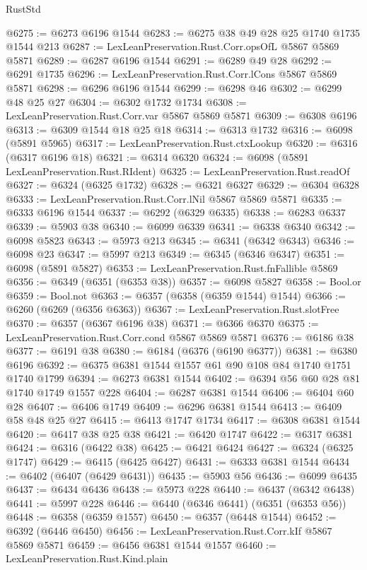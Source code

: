 \begin{lexlean}{RustStd}
\begin{coremodule}
@6275 := @6273 @6196 @1544
@6283 := @6275 @38 @49 @28 @25 @1740 @1735 @1544 @213
@6287 := LexLeanPreservation.Rust.Corr.opsOfL @5867 @5869 @5871
@6289 := @6287 @6196 @1544
@6291 := @6289 @49 @28
@6292 := @6291 @1735
@6296 := LexLeanPreservation.Rust.Corr.lCons @5867 @5869 @5871
@6298 := @6296 @6196 @1544
@6299 := @6298 @46
@6302 := @6299 @48 @25 @27
@6304 := @6302 @1732 @1734
@6308 := LexLeanPreservation.Rust.Corr.var @5867 @5869 @5871
@6309 := @6308 @6196
@6313 := @6309 @1544 @18 @25 @18
@6314 := @6313 @1732
@6316 := @6098 (@5891 @5965)
@6317 := LexLeanPreservation.Rust.ctxLookup
@6320 := @6316 (@6317 @6196 @18)
@6321 := @6314 @6320
@6324 := @6098 (@5891 LexLeanPreservation.Rust.RIdent)
@6325 := LexLeanPreservation.Rust.readOf
@6327 := @6324 (@6325 @1732)
@6328 := @6321 @6327
@6329 := @6304 @6328
@6333 := LexLeanPreservation.Rust.Corr.lNil @5867 @5869 @5871
@6335 := @6333 @6196 @1544
@6337 := @6292 (@6329 @6335)
@6338 := @6283 @6337
@6339 := @5903 @38
@6340 := @6099 @6339
@6341 := @6338 @6340
@6342 := @6098 @5823
@6343 := @5973 @213
@6345 := @6341 (@6342 @6343)
@6346 := @6098 @23
@6347 := @5997 @213
@6349 := @6345 (@6346 @6347)
@6351 := @6098 (@5891 @5827)
@6353 := LexLeanPreservation.Rust.fnFallible @5869
@6356 := @6349 (@6351 (@6353 @38))
@6357 := @6098 @5827
@6358 := Bool.or
@6359 := Bool.not
@6363 := @6357 (@6358 (@6359 @1544) @1544)
@6366 := @6260 (@6269 (@6356 @6363))
@6367 := LexLeanPreservation.Rust.slotFree
@6370 := @6357 (@6367 @6196 @38)
@6371 := @6366 @6370
@6375 := LexLeanPreservation.Rust.Corr.cond @5867 @5869 @5871
@6376 := @6186 @38
@6377 := @6191 @38
@6380 := @6184 (@6376 (@6190 @6377))
@6381 := @6380 @6196
@6392 := @6375 @6381 @1544 @1557 @61 @90 @108 @84 @1740 @1751 @1740 @1799
@6394 := @6273 @6381 @1544
@6402 := @6394 @56 @60 @28 @81 @1740 @1749 @1557 @228
@6404 := @6287 @6381 @1544
@6406 := @6404 @60 @28
@6407 := @6406 @1749
@6409 := @6296 @6381 @1544
@6413 := @6409 @58 @48 @25 @27
@6415 := @6413 @1747 @1734
@6417 := @6308 @6381 @1544
@6420 := @6417 @38 @25 @38
@6421 := @6420 @1747
@6422 := @6317 @6381
@6424 := @6316 (@6422 @38)
@6425 := @6421 @6424
@6427 := @6324 (@6325 @1747)
@6429 := @6415 (@6425 @6427)
@6431 := @6333 @6381 @1544
@6434 := @6402 (@6407 (@6429 @6431))
@6435 := @5903 @56
@6436 := @6099 @6435
@6437 := @6434 @6436
@6438 := @5973 @228
@6440 := @6437 (@6342 @6438)
@6441 := @5997 @228
@6446 := @6440 (@6346 @6441) (@6351 (@6353 @56))
@6448 := @6358 (@6359 @1557)
@6450 := @6357 (@6448 @1544)
@6452 := @6392 (@6446 @6450)
@6456 := LexLeanPreservation.Rust.Corr.kIf @5867 @5869 @5871
@6459 := @6456 @6381 @1544 @1557
@6460 := LexLeanPreservation.Rust.Kind.plain

\end{coremodule}
\end{lexlean}
